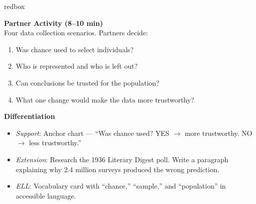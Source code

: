 \documentclass[10pt]{article}
\begin{document}
\begin{skillbox}{redbox}
\begin{minipage}[t]{0.48\linewidth}
    \textbf{Partner Activity (8--10 min)}\\
    Four data collection scenarios. Partners decide:
    \begin{enumerate}
        \item Was chance used to select individuals?
        \item Who is represented and who is left out?
        \item Can conclusions be trusted for the population?
        \item What one change would make the data more trustworthy?
    \end{enumerate}
\end{minipage}
\hfill
\begin{minipage}[t]{0.48\linewidth}
    \textbf{Differentiation}
    \begin{itemize}
        \item \textit{Support}: Anchor chart --- ``Was chance used? YES $\to$ more
              trustworthy. NO $\to$ less trustworthy.''
        \item \textit{Extension}: Research the 1936 Literary Digest poll. Write a
              paragraph explaining why 2.4 million surveys produced the wrong prediction.
        \item \textit{ELL}: Vocabulary card with ``chance,'' ``sample,'' and
              ``population'' in accessible language.
    \end{itemize}
\end{minipage}
\end{skillbox}
\end{document}
